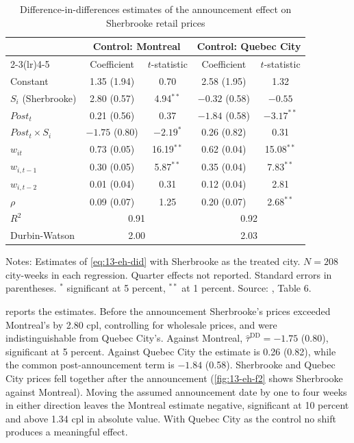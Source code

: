 \begin{table}[htbp]
\centering
\caption{Difference-in-differences estimates of the announcement effect on Sherbrooke retail prices}\label{tab:13-eh-t6}
\small
\begin{tabular}{lcccc}
\toprule
 & \multicolumn{2}{c}{Control: Montreal} & \multicolumn{2}{c}{Control: Quebec City}\\
\cmidrule(lr){2-3}\cmidrule(lr){4-5}
 & Coefficient & $t$-statistic & Coefficient & $t$-statistic\\
\midrule
Constant & 1.35 (1.94) & 0.70 & 2.58 (1.95) & 1.32\\
$S_i$ (Sherbrooke) & 2.80 (0.57) & 4.94$^{**}$ & $-0.32$ (0.58) & $-0.55$\\
$\textit{Post}_t$ & 0.21 (0.56) & 0.37 & $-1.84$ (0.58) & $-3.17^{**}$\\
$\textit{Post}_t\times S_i$ & $-1.75$ (0.80) & $-2.19^{*}$ & 0.26 (0.82) & 0.31\\
$w_{it}$ & 0.73 (0.05) & 16.19$^{**}$ & 0.62 (0.04) & 15.08$^{**}$\\
$w_{i,t-1}$ & 0.30 (0.05) & 5.87$^{**}$ & 0.35 (0.04) & 7.83$^{**}$\\
$w_{i,t-2}$ & 0.01 (0.04) & 0.31 & 0.12 (0.04) & 2.81\\
$\rho$ & 0.09 (0.07) & 1.25 & 0.20 (0.07) & 2.68$^{**}$\\
\addlinespace
$R^2$ & \multicolumn{2}{c}{0.91} & \multicolumn{2}{c}{0.92}\\
Durbin-Watson & \multicolumn{2}{c}{2.00} & \multicolumn{2}{c}{2.03}\\
\bottomrule
\end{tabular}

\smallskip
\begin{minipage}{0.86\textwidth}\footnotesize
Notes: Estimates of \eqref{eq:13-eh-did} with Sherbrooke as the treated city. $N=208$ city-weeks in each regression. Quarter effects not
reported. Standard errors in parentheses. $^{*}$ significant at 5 percent, $^{**}$ at 1 percent. Source: \citet{ErutkuHildebrand2010},
Table 6.
\end{minipage}
\end{table}

 reports the estimates. Before the announcement Sherbrooke's prices exceeded Montreal's by 2.80 cpl, controlling
for wholesale prices, and were indistinguishable from Quebec City's. Against Montreal, $\hat\tau^{\mathrm{DD}}=-1.75$ (0.80), significant
at 5 percent. Against Quebec City the estimate is 0.26 (0.82), while the common post-announcement term is $-1.84$ (0.58). Sherbrooke and
Quebec City prices fell together after the announcement (\cref{fig:13-eh-f2} shows Sherbrooke against Montreal). Moving the assumed
announcement date by one to four weeks in either direction leaves the Montreal estimate negative, significant at 10 percent and above
1.34 cpl in absolute value. With Quebec City as the control no shift produces a meaningful effect.

